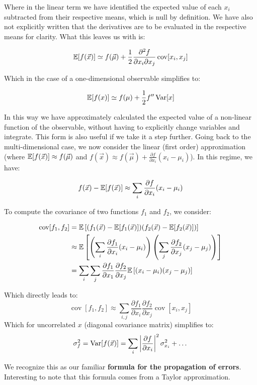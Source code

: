Where in the linear term we have identified the expected value of each $x_i$ subtracted from their respective means, which is null by definition. We have also not explicitly written that the derivatives are to be evaluated in the respective means for clarity. What this leaves us with is:

	\[
	\mathbb{E}[f(\vec{x})] \simeq f(\vec{\mu}) + \frac{1}{2}\frac{\partial^2f}{\partial x_i \partial x_j}\operatorname{cov}[x_i,x_j]
	\]

Which in the case of a one-dimensional observable simplifies to:

	\[
	\mathbb{E}[f(x)] \simeq f(\mu) + \frac{1}{2}f^{\prime\prime}\operatorname{Var}[x]
	\]

In this way we have approximately calculated the expected value of a non-linear function of the observable, without having to explicitly change variables and integrate. This form is also useful if we take it a step further. Going back to the multi-dimensional case, we now consider the linear (first order) approximation (where $\mathbb{E}[f(\vec{x})]\approx f(\vec{\mu})$ and $f(\vec{x}) \approx f(\vec{\mu}) + \frac{\partial f}{\partial x_i}(x_i-\mu_i)$). In this regime, we have:

	\[
	f(\vec{x}) - \mathbb{E}[f(\vec{x})] \approx \sum_i \frac{\partial f}{\partial x_i}(x_i-\mu_i)
	\]
	
To compute the covariance of two functions $f_1$ and $f_2$, we consider:

	\begin{align*}
		\operatorname{cov}[f_1,f_2]&=\mathbb{E} \left[(f_1(\vec{x})-\mathbb{E}[f_1(\vec{x})])(f_2(\vec{x})-\mathbb{E}[f_2(\vec{x})])\right] \\
		&\approx \mathbb{E} \left[\left(\sum_i\frac{\partial f_1}{\partial x_i}(x_i-\mu_i)\right)\left(\sum_j\frac{\partial f_2}{\partial x_j}(x_j-\mu_j)\right)\right] \\
		&= \sum_i \sum_j \frac{\partial f_1}{\partial x_1} \frac{\partial f_2}{\partial x_j} \mathbb{E} \left[(x_i-\mu_i)(x_j-\mu_j)\right]
	\end{align*}

Which directly leads to:
	\[
	\operatorname{cov}[f_1,f_2] \approx \sum_{i,j}\frac{\partial f_1}{\partial x_i}\frac{\partial f_2}{\partial x_j}\operatorname{cov}[x_i,x_j]
	\]
Which for uncorrelated $x$ (diagonal covariance matrix) simplifies to:
	\[
	\sigma_f^2 = \operatorname{Var}[f(\vec{x})] = \sum_i \left| \frac{\partial f}{\partial x_i} \right|^2\sigma_{x_i}^2 +\dots
	\]
	
We recognize this as our familiar \textbf{formula for the propagation of errors}. Interesting to note that this formula comes from a Taylor approximation.

